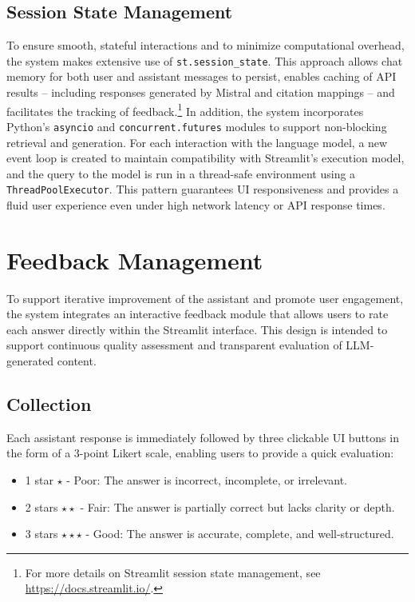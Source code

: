 \begin{spacing}{1.5}
\subsection{Session State Management}
To ensure smooth, stateful interactions and to minimize computational overhead, the system makes extensive use of \texttt{st.session\_state}. This approach allows chat memory for both user and assistant messages to persist, enables caching of API results -- including responses generated by Mistral and citation mappings -- and facilitates the tracking of feedback.\footnote{For more details on Streamlit session state management, see \url{https://docs.streamlit.io/}.\nocite{noauthor_streamlit_2025}} In addition, the system incorporates Python’s \texttt{asyncio} and \texttt{concurrent.futures} modules to support non-blocking retrieval and generation. For each interaction with the language model, a new event loop is created to maintain compatibility with Streamlit’s execution model, and the query to the model is run in a thread-safe environment using a \texttt{ThreadPoolExecutor}. This pattern guarantees UI responsiveness and provides a fluid user experience even under high network latency or API response times.

\section{Feedback Management}
To support iterative improvement of the assistant and promote user engagement, the system integrates an interactive feedback module that allows users to rate each answer directly within the Streamlit interface. This design is intended to support continuous quality assessment and transparent evaluation of LLM-generated content.

\subsection{Collection}
Each assistant response is immediately followed by three clickable UI buttons in the form of a 3-point Likert scale, enabling users to provide a quick evaluation:
\begin{itemize}
\item 1 star $\star$ - Poor: The answer is incorrect, incomplete, or irrelevant.
\item 2 stars $\star\star$ - Fair: The answer is partially correct but lacks clarity or depth.
\item 3 stars $\star\star\star$ - Good: The answer is accurate, complete, and well-structured.
\end{itemize}


\end{spacing}
